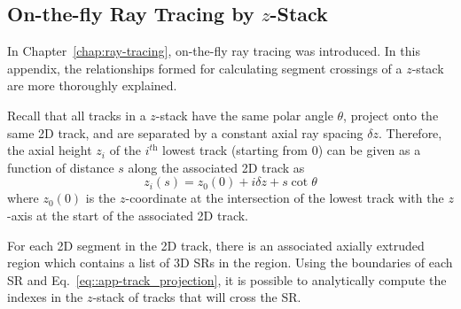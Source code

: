 \begin{appendices}
\chapter{On-the-fly Ray Tracing by $z$-Stack}
\label{app:z-stack}

In Chapter~\ref{chap:ray-tracing}, on-the-fly ray tracing was introduced. In this appendix, the relationships formed for calculating segment crossings of a $z$-stack are more thoroughly explained.

Recall that all tracks in a $z$-stack have the same polar angle $\theta$, project onto the same 2D track, and are separated by a constant axial ray spacing $\delta z$. Therefore, the axial height $z_i$ of the $i^{\textit{th}}$ lowest track (starting from 0) can be given as a function of distance $s$ along the associated 2D track as
\begin{equation}
z_i(s) = z_0(0) + i\delta z + s \cot{\theta}
\label{eq::app-track_projection}
\end{equation}
where $z_0(0)$ is the $z$-coordinate at the intersection of the lowest track with the $z$-axis at the start of the associated 2D track.

For each 2D segment in the 2D track, there is an associated axially extruded region which contains a list of 3D \ac{SR}s in the region. Using the boundaries of each \ac{SR} and Eq.~\ref{eq::app-track_projection}, it is possible to analytically compute the indexes in the $z$-stack of tracks that will cross the \ac{SR}.


\end{appendices}
